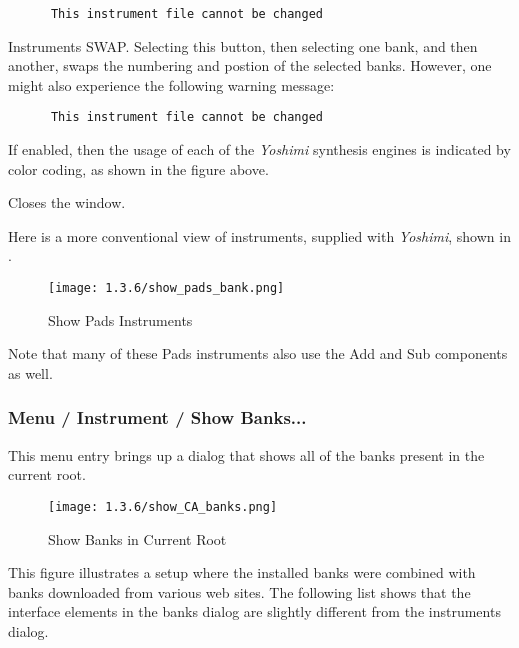    \begin{verbatim}
      This instrument file cannot be changed
   \end{verbatim}

   Instruments SWAP.
   Selecting this button, then selecting one bank, and then another,
   swaps the numbering and postion of the selected banks.
   However, one might also experience the following warning message:

   \begin{verbatim}
      This instrument file cannot be changed
   \end{verbatim}

   If enabled, then the usage of each of the \textsl{Yoshimi} synthesis
   engines is indicated by color coding, as shown in the figure above.

   Closes the window.

   Here is a more conventional view of instruments, supplied with
   \textsl{Yoshimi}, shown in
   .

\begin{figure}[H]
   \centering 
   \texttt{[image: 1.3.6/show\_pads\_bank.png]}
   \caption[Show Pads Instruments]{Show Pads Instruments}
   \label{fig:show_pads_bank}
\end{figure}

   Note that many of these Pads instruments also use the Add and Sub
   components as well.

\subsubsection{Menu / Instrument / Show Banks...}
\label{subsubsec:menu_instrument_show_banks}

   This menu entry brings up a dialog that shows all of the banks present in
   the current root.

\begin{figure}[H]
   \centering 
   \texttt{[image: 1.3.6/show\_CA\_banks.png]}
   \caption[Show Banks]{Show Banks in Current Root}
   \label{fig:show_ca_banks}
\end{figure}

   This figure illustrates a setup where the installed banks were combined with
   banks downloaded from various web sites.
   The following list shows that the interface elements in the banks dialog
   are slightly different from the instruments dialog.

